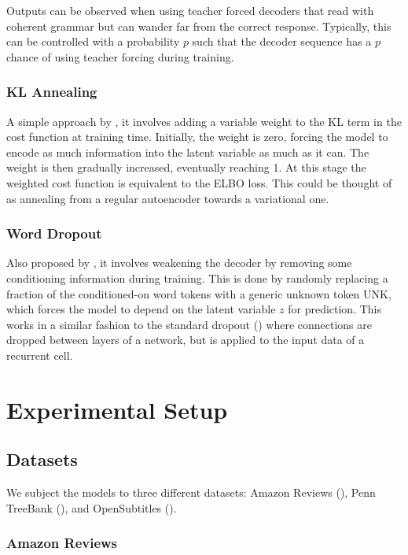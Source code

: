 \documentclass[12pt,twoside]{report}
\begin{document}
Outputs can be observed when using teacher forced decoders that read with coherent grammar but can wander far from the correct response. Typically, this can be controlled with a probability $p$ such that the decoder sequence has a $p$ chance of using teacher forcing during training.

\subsection{KL Annealing}

A simple approach by \cite{bowman_generating_2015}, it involves adding a variable weight to the KL term in the cost function at training time. Initially, the weight is zero, forcing the model to encode as much information into the latent variable as much as it can. The weight is then gradually increased, eventually reaching 1. At this stage the weighted cost function is equivalent to the ELBO loss. This could be thought of as annealing from a regular autoencoder towards a variational one.

\subsection{Word Dropout}
Also proposed by \cite{bowman_generating_2015}, it involves weakening the decoder by removing some conditioning information during training. This is done by randomly replacing a fraction of the conditioned-on word tokens with a generic unknown token UNK, which forces the model to depend on the latent variable $z$ for prediction. This works in a similar fashion to the standard dropout (\cite{srivastava_dropout:_2014}) where connections are dropped between layers of a network, but is applied to the input data of a recurrent cell.

\chapter{Experimental Setup}


\section{Datasets}

We subject the models to three different datasets: Amazon Reviews (\cite{he_ups_2016}), Penn TreeBank (\cite{marcus_building_2002}), and OpenSubtitles (\cite{lison_opensubtitles2016:_2016}).


\subsection{Amazon Reviews}
\end{document}
